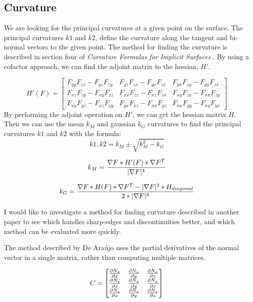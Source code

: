 \documentclass[conference]{acmsiggraph}
\begin{document}
\subsection{Curvature}
We are looking for the principal curvatures at a given point on the surface.
The principal curvatures $k1$ and $k2$, define the curvature along the tangent
and bi-normal vectors to the given point. The method for finding the curvature
is described in section four of \textit{Curvature Formulas for Implicit
Surfaces} \cite{Goldman2005}. By using a cofactor approach, we can find the adjoint matrix to the
hessian, $H'$. 

$$
H'(F) =
\begin{bmatrix}
	F_{yy}F_{zz} - F_{yz}F_{zy} & F_{yz}F_{zx} - F_{yx}F_{zz} & F_{yx}F_{zy} - F_{yy}F_{zx} \\
	F_{xz}F_{zy} - F_{xy}F_{zz} & F_{xx}F_{zz} - F_{xz}F_{zx} & F_{xy}F_{zx} - F_{xx}F_{zy} \\
	F_{xy}F_{yz} - F_{xz}F_{yy} & F_{yx}F_{xz} - F_{xx}F_{yz} & F_{xx}F_{yy} - F_{xy}F_{yx}
\end{bmatrix}
$$
By performing the adjoint operation on $H'$, we can get the
hessian matrix $H$. Then we can use the mean $k_M$ and gaussian $k_G$
curvatures to find
the principal curvatures $k1$ and $k2$ with the formula:
$$k1, k2 = k_M \pm \sqrt{k^2_{M} - k_G}$$


$$k_M = {\nabla F * H'(F) * \nabla F^T \over |\nabla F|^4}$$

$$k_G = {\nabla F * H(F) * \nabla F^T - |\nabla F|^2 * H_{diagonal} \over 2 *
|\nabla F|^3}$$

I would like to investigate a method for finding curvature described in another
paper\cite{DeAraujo2004} to see which handles sharp-edges and discontinuities
better, and which method can be evaluated more quickly.

The method described by De Ara\'{u}jo uses the partial derivatives of the
normal vector in a single matrix, rather than computing multiple matrices.

$$
C=
\begin{bmatrix}
	{\partial N_x \over \partial x}&{\partial N_x \over \partial y}&{\partial N_x \over \partial z}\\
	{\partial N_y \over \partial x}&{\partial N_y \over \partial y}&{\partial N_y \over \partial z}\\
	{\partial N_z \over \partial x}&{\partial N_z \over \partial y}&{\partial N_z \over \partial z}
\end{bmatrix}
$$
\end{document}
